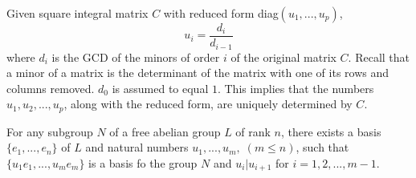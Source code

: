   \begin{lemma}
    Given square integral matrix $C$ with  reduced form diag$(u_1, ..., u_p)$, 
    \begin{equation}
      u_i = \frac{d_i}{d_{i-1}}
    \end{equation}
    where $d_i$ is the GCD of the minors of order $i$ of the original matrix $C$. Recall that a minor of a matrix is the determinant of the matrix with one of its rows and columns removed. $d_0$ is assumed to equal $1$. This implies that the numbers $u_1, u_2, ..., u_p$, along with the reduced form, are uniquely determined by $C$. 
  \end{lemma}

  \begin{theorem}
    For any subgroup $N$ of a free abelian group $L$ of rank $n$, there exists a basis $\{e_1, ..., e_n\}$ of $L$ and natural numbers $u_1, ..., u_m, \; (m \leq n)$, such that $\{u_1 e_1, ..., u_m e_m\}$ is a basis fo the group $N$ and $u_i | u_{i+1}$ for $i = 1, 2, ..., m-1$. 
  \end{theorem}
    
